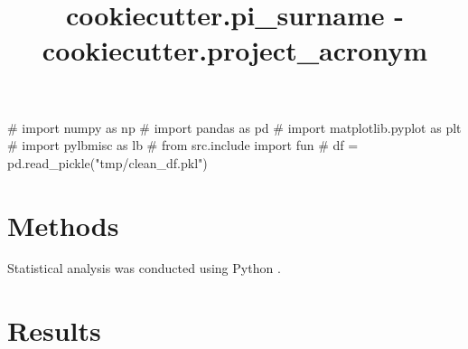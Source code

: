 \documentclass{article}
\begin{document}
\title{ {{cookiecutter.pi_surname}} - {{cookiecutter.project_acronym}} }
\maketitle
\tableofcontents
\begin{pycode}
# import numpy as np
# import pandas as pd
# import matplotlib.pyplot as plt
# import pylbmisc as lb
# from src.include import fun
# df = pd.read_pickle("tmp/clean_df.pkl")

\end{pycode}


\section{Methods}


Statistical analysis was conducted using Python \cite{python}.

\section{Results}






\printbibliography 
\end{document}
